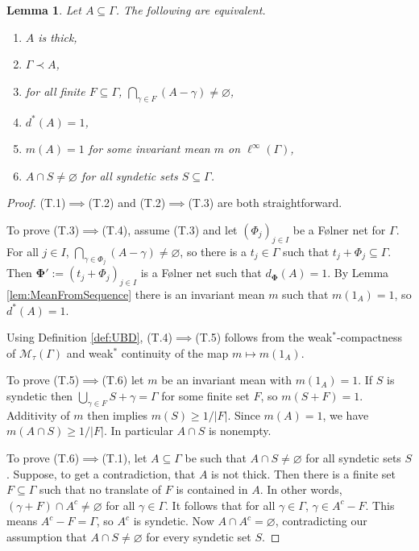 \documentclass[12pt]{amsart} \usepackage{amsmath,centernot,amssymb,leftindex}
\newcommand{\mb}{\mathbf}
\newtheorem{lemma}[theorem]{Lemma}
\numberwithin{theorem}{section}
\numberwithin{equation}{section}
\theoremstyle{definition}
\begin{document}
	\begin{lemma}\label{lem:ThickEquivalents}   Let $A\subseteq \Gamma$.  The following are equivalent.
		
		\begin{enumerate}[label=(T.\arabic*)] 
			\item\label{item:isThick} $A$ is thick,
			\item $\Gamma\prec A$,
			\item for all finite $F\subseteq \Gamma$, $\bigcap_{\gamma \in F} (A-\gamma)\neq \varnothing$,
			\item $d^*(A)=1$,
			\item\label{item:MeanEquals1} $m(A)=1$ for some invariant mean $m$ on $\ell^\infty(\Gamma)$,
			\item $A\cap S\neq \varnothing$ for all syndetic sets $S\subseteq \Gamma$.
		\end{enumerate}
	\end{lemma}
	\begin{proof}
		(T.1)$\implies$(T.2) and (T.2)$\implies$(T.3) are both straightforward.  
		
		To prove (T.3)$\implies$(T.4), assume (T.3) and let $(\Phi_j)_{j\in I}$ be a F{\o}lner net for $\Gamma$.  For all $j\in I$, $\bigcap_{\gamma\in \Phi_j} (A-\gamma)\neq \varnothing$, so there is a $t_j\in \Gamma$ such that $t_j+\Phi_j\subseteq \Gamma$.  Then $\mathbf{\Phi}':=(t_j+\Phi_j)_{j\in I}$ is a F{\o}lner net such that  $d_{\mb \Phi}(A)=1$.  By Lemma \ref{lem:MeanFromSequence} there is an invariant mean $m$ such that $m(1_{A})=1$, so $d^{*}(A)=1$.
		
		Using Definition \ref{def:UBD}, (T.4)$\implies$(T.5) follows from the weak$^{*}$-compactness of $\mathcal M_{\tau}(\Gamma)$ and weak$^{*}$ continuity of the map $m\mapsto m(1_{A})$.
		
		To prove (T.5)$\implies$(T.6) let $m$ be an invariant mean with $m(1_A)=1$. If $S$ is syndetic then $\bigcup_{\gamma\in F} S+\gamma=\Gamma$ for some finite set $F$, so $m(S+F)=1$. Additivity of $m$ then implies $m(S)\geq 1/|F|$.  Since $m(A)=1$, we have $m(A\cap S)\geq 1/|F|$.  In particular $A\cap S$ is nonempty.
		
		To prove (T.6)$\implies$(T.1), let $A\subseteq \Gamma$ be such that $A\cap S\neq \varnothing$ for all syndetic sets $S$.  Suppose, to get a contradiction, that $A$ is not thick.  Then there is a finite set $F\subseteq \Gamma$ such that no translate of $F$ is contained in $A$.  In other words, $(\gamma +F)\cap A^{c}\neq \varnothing$ for all $\gamma \in \Gamma$.  It follows that for all $\gamma\in \Gamma$, $\gamma \in A^{c}-F$.  This means $A^{c}-F=\Gamma$, so $A^{c}$ is syndetic.  Now $A\cap A^{c}=\varnothing$, contradicting our assumption that $A\cap S\neq \varnothing$ for every syndetic set $S$.\end{proof}
		
\end{document}
